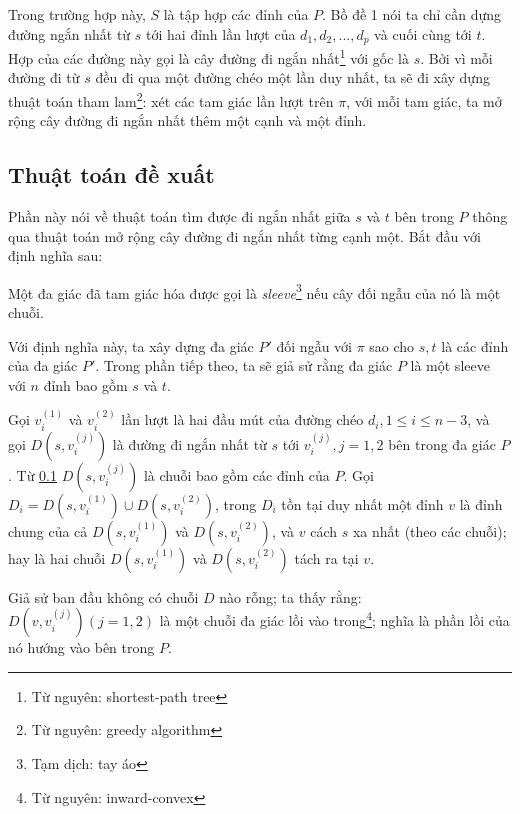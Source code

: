 Trong trường hợp này, $S$ là tập hợp các đỉnh của $P$. Bồ đề 1 nói ta chỉ cần dựng đường ngắn nhất từ $s$ tới hai đỉnh lần lượt của $d_1, d_2, ...,d_p$ và cuối cùng tới $t$. Hợp của các đường này gọi là cây đường đi ngắn nhất\footnote{Từ nguyên: shortest-path tree} với gốc là $s$. Bởi vì mỗi đường đi từ $s$ đều đi qua một đường chéo một lần duy nhất, ta sẽ đi xây dựng thuật toán tham lam\footnote{Từ nguyên: greedy algorithm}: xét các tam giác lần lượt trên $\pi$, với mỗi tam giác, ta mở rộng cây đường đi ngắn nhất thêm một cạnh và một đỉnh.


\subsection{Thuật toán đề xuất}
Phần này nói về thuật toán tìm được đi ngắn nhất giữa $s$ và $t$ bên trong $P$ thông qua thuật toán mở rộng cây đường đi ngắn nhất từng cạnh một. Bắt đầu với định nghĩa sau:
\begin{definition}
    Một đa giác đã tam giác hóa được gọi là \textit{sleeve}\footnote{Tạm dịch: tay áo} nếu cây đối ngẫu của nó là một chuỗi.
\end{definition}

Với định nghĩa này, ta xây dựng đa giác $P'$ đối ngẫu với $\pi$ sao cho $s, t$ là các đỉnh của đa giác $P'$. Trong phần tiếp theo,  ta sẽ giả sử rằng đa giác $P$ là một sleeve với $n$ đỉnh bao gồm $s$ và  $t$.  

Gọi $v^{(1)}_i$ và $v^{(2)}_i$ lần lượt là hai đầu mút của đường chéo $d_i, 1 \le i \le n -3$,  và gọi $D\left(s, v^{(j)}_i\right)$ là đường đi ngắn nhất từ $s$ tới $v^{(j)}_i, j = 1, 2$ bên trong đa giác $P$. Từ \ref{} $D\left(s, v^{(j)}_i\right)$ là chuỗi bao gồm các đỉnh của  $P$. Gọi $D_i = D\left(s, v^{(1)}_i\right) \cup D\left(s, v^{(2)}_i\right)$, trong $D_i$ tồn tại duy nhất một đỉnh $v$ là đỉnh chung của cả $D\left(s, v^{(1)}_i\right) $ và $ D\left(s, v^{(2)}_i\right)$, và $v$ cách $s$ xa nhất (theo các chuỗi); hay là hai chuỗi $D\left(s, v^{(1)}_i\right) $ và $ D\left(s, v^{(2)}_i\right)$ tách ra tại $v$. 

Giả sử ban đầu không có chuỗi $D$ nào rỗng; ta thấy rằng: $D\left(v, v^{(j)}_i\right) (j=1,2)$ là một chuỗi đa giác lồi vào trong\footnote{Từ nguyên: inward-convex}; nghĩa là phần lồi của nó hướng vào bên trong $P$.  

